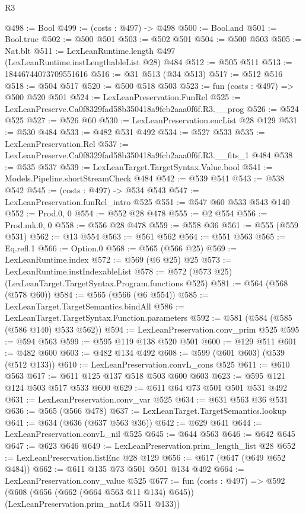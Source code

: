 \begin{lexlean}{R3}
\begin{coremodule}
@498 := Bool
@499 := (costs : @497) -> @498
@500 := Bool.and
@501 := Bool.true
@502 := @500 @501
@503 := @502 @501
@504 := @500 @503
@505 := Nat.blt
@511 := LexLeanRuntime.length @497 (LexLeanRuntime.instLengthableList @28) @484
@512 := @505 @511
@513 := 18446744073709551616
@516 := @31 @513 (@34 @513)
@517 := @512 @516
@518 := @504 @517
@520 := @500 @518 @503
@523 := fun (costs : @497) => @500 @520 @501
@524 := LexLeanPreservation.FunRel
@525 := LexLeanPreserve.Ca0f8329fad58b350418a9fcb2aaa0f6f.R3.__prog
@526 := @524 @525
@527 := @526 @60
@530 := LexLeanPreservation.encList @28 @129
@531 := @530 @484
@533 := @482 @531 @492
@534 := @527 @533
@535 := LexLeanPreservation.Rel
@537 := LexLeanPreserve.Ca0f8329fad58b350418a9fcb2aaa0f6f.R3.__fits_1 @484
@538 := @535 @537
@539 := LexLeanTarget.TargetSyntax.Value.bool
@541 := Models.Pipeline.shortStreamCheck @484
@542 := @539 @541
@543 := @538 @542
@545 := (costs : @497) -> @534 @543
@547 := LexLeanPreservation.funRel_intro @525
@551 := @547 @60 @533 @543 @140
@552 := Prod.{0, 0}
@554 := @552 @28 @478
@555 := @2 @554
@556 := Prod.mk.{0, 0}
@558 := @556 @28 @478
@559 := @558 @36
@561 := @555 (@559 @531)
@562 := @13 @554
@563 := @561 @562
@564 := @551 @563
@565 := Eq.refl.{1}
@566 := Option.{0}
@568 := @565 (@566 @25)
@569 := LexLeanRuntime.index
@572 := @569 (@6 @25) @25
@573 := LexLeanRuntime.instIndexableList
@578 := @572 (@573 @25) (LexLeanTarget.TargetSyntax.Program.functions @525)
@581 := @564 (@568 (@578 @60))
@584 := @565 (@566 (@6 @554))
@585 := LexLeanTarget.TargetSemantics.bindAll
@586 := LexLeanTarget.TargetSyntax.Function.parameters
@592 := @581 (@584 (@585 (@586 @140) @533 @562))
@594 := LexLeanPreservation.conv_prim @525
@595 := @594 @563
@599 := @595 @119 @138 @520 @501
@600 := @129 @511
@601 := @482 @600
@603 := @482 @134 @492
@608 := @599 (@601 @603) (@539 (@512 @133))
@610 := LexLeanPreservation.convL_cons @525
@611 := @610 @563
@617 := @611 @125 @137 @518 @503 @600 @603
@623 := @595 @121 @124 @503 @517 @533 @600
@629 := @611 @64 @73 @501 @501 @531 @492
@631 := LexLeanPreservation.conv_var @525
@634 := @631 @563 @36 @531
@636 := @565 (@566 @478)
@637 := LexLeanTarget.TargetSemantics.lookup
@641 := @634 (@636 (@637 @563 @36))
@642 := @629 @641
@644 := LexLeanPreservation.convL_nil @525
@645 := @644 @563
@646 := @642 @645
@647 := @623 @646
@649 := LexLeanPreservation.prim_length_list @28
@652 := LexLeanPreservation.listEnc @28 @129
@656 := @617 (@647 (@649 @652 @484))
@662 := @611 @135 @73 @501 @501 @134 @492
@664 := LexLeanPreservation.conv_value @525
@677 := fun (costs : @497) =>
  @592 (@608 (@656 (@662 (@664 @563 @11 @134) @645)) (LexLeanPreservation.prim_natLt @511 @133))

\end{coremodule}
\end{lexlean}
